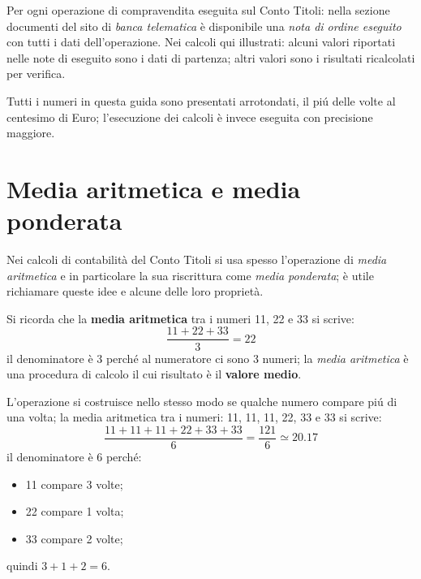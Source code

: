 \documentclass[12pt,a4paper]{article}
\begin{document}
Per ogni operazione di compravendita eseguita sul  Conto Titoli: nella sezione documenti del sito di
\emph{banca  telematica}  è  disponibile  una  \emph{nota  di ordine  eseguito}  con  tutti  i  dati
dell'operazione.  Nei calcoli qui illustrati: alcuni valori  riportati nelle note di eseguito sono i
dati di partenza; altri valori sono i risultati ricalcolati per verifica.

Tutti i numeri in questa guida sono presentati arrotondati, il piú delle volte al centesimo di Euro;
l'esecuzione dei calcoli è invece eseguita con precisione maggiore.


\section{Media aritmetica e media ponderata}


Nei calcoli di contabilità del Conto Titoli  si usa spesso l'operazione di \emph{media aritmetica} e
in particolare  la sua  riscrittura come \emph{media  ponderata}; è utile  richiamare queste  idee e
alcune delle loro proprietà.

Si ricorda che la \textbf{media aritmetica} tra i numeri \num{11}, \num{22} e \num{33} si scrive:
\begin{equation*}
  \frac{\num{11} + \num{22} + \num{33}}{3} = \num{22}
\end{equation*}
il denominatore è \num{3} perché al numeratore  ci sono \num{3} numeri; la \emph{media aritmetica} è
una procedura di calcolo il cui risultato è il \textbf{valore medio}.

L'operazione si costruisce  nello stesso modo se qualche  numero compare piú di una  volta; la media
aritmetica tra i numeri: \num{11}, \num{11}, \num{11}, \num{22}, \num{33} e \num{33} si scrive:
\begin{equation*}
  \frac{\num{11} + \num{11} + \num{11} + \num{22} + \num{33} + \num{33}}{6}
  = \frac{121}{6} \simeq \num{20,17}
\end{equation*}
il denominatore è \num{6} perché:
\begin{itemize}
\item \num{11} compare \num{3} volte;
\item \num{22} compare \num{1} volta;
\item \num{33} compare \num{2} volte;
\end{itemize}
quindi \(\num{3} + \num{1} + \num{2} = \num{6}\).
\end{document}
